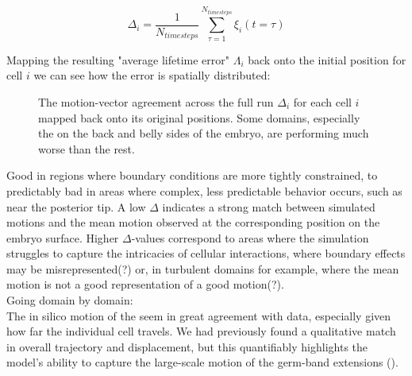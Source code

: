 \begin{equation}
     \label{eq:Delta-measure}
     \Delta_i = \frac{1}{N_{timesteps}}\sum_{\tau = 1}^{N_{timesteps}}\xi_i(t=\tau)
     
\end{equation}

Mapping the resulting "average lifetime error" $\Lambda_i$ back onto the initial position for cell $i$ we can see how the error is spatially distributed:
\begin{figure}[H]
    \centering
    \caption{The motion-vector agreement across the full run $\Delta_i$ for each cell $i$ mapped back onto its original positions. Some domains, especially the on the back and belly sides of the embryo, are performing much worse than the rest.  }
    \label{fig:}
\end{figure}



Good in regions where boundary conditions are more tightly constrained, to predictably bad in areas where complex, less predictable behavior occurs, such as near the posterior tip.  A low $\Delta$ indicates a strong match between simulated motions and the mean motion observed at the corresponding position on the embryo surface. Higher $\Delta$-values correspond to areas where the simulation struggles to capture the intricacies of cellular interactions, where boundary effects may be misrepresented(?) or, in turbulent domains for example, where the mean motion is not a good representation of a good motion(?).\\

Going domain by domain:\\

The in silico motion of the  seem in great agreement with data, especially given how far the individual cell travels. We had previously found a qualitative match in overall trajectory and displacement, but this quantifiably highlights the model's ability to capture the large-scale motion of the germ-band extensions ().\\


